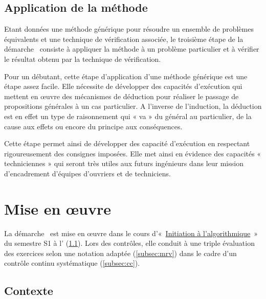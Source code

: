 \documentclass[11pt,a4paper,colorlinks,breaklinks]{article}
\begin{document}
\subsection{Application de la méthode}\label{subsec:resultat}
Etant données une méthode générique pour résoudre un ensemble de problèmes 
équivalents et une technique de vérification associée, le troisième étape 
de la démarche \mvr\ consiste à
appliquer la méthode à un problème particulier et à vérifier le résultat obtenu
par la technique de vérification.

Pour un débutant, cette étape d'application d'une méthode générique est une étape 
assez facile. Elle nécessite de développer des capacités d'exécution
qui mettent en \oe uvre des mécanismes de déduction pour réaliser le passage
de propositions générales à un cas particulier.
A l'inverse de l'induction, la déduction est en effet un type de raisonnement
qui « va » du général au particulier, de la cause aux effets ou encore du principe aux
conséquences.

Cette étape permet ainsi de développer des capacité d'exécution en respectant
rigoureusement des consignes imposées. Elle met ainsi en évidence des capacités 
« techniciennes » qui seront très utiles aux futurs ingénieurs dans leur mission 
d'encadrement d'équipes d'ouvriers et de techniciens.


\section{Mise en \oe uvre}\label{sec:application}
La démarche \mvr\ est mise en \oe uvre dans le cours 
d'«~\href{http://www.enib.fr/~tisseau/pdf/course/info-S1.pdf}{Initiation à l'algorithmique}~» 
du semestre S1 à l'\enib{} (\ref{subsec:contexte}). 
Lors des contrôles, elle conduit à une triple évaluation des exercices 
selon une notation adaptée (\ref{subsec:mrv}) dans le cadre d'un contrôle continu 
systématique (\ref{subsec:cc}). 


\subsection{Contexte}\label{subsec:contexte}
\end{document}
